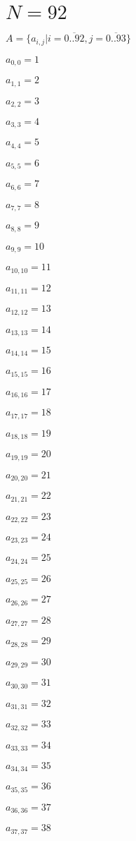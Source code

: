 \documentclass[a4paper,12pt]{article}
\begin{document}
\section{ $N = 92$ }
$A = \{ a _{ i, j } | i = \overline { 0..92 }, j = \overline { 0..93 } \}$

$a _{ 0, 0 } = 1$

$a _{ 1, 1 } = 2$

$a _{ 2, 2 } = 3$

$a _{ 3, 3 } = 4$

$a _{ 4, 4 } = 5$

$a _{ 5, 5 } = 6$

$a _{ 6, 6 } = 7$

$a _{ 7, 7 } = 8$

$a _{ 8, 8 } = 9$

$a _{ 9, 9 } = 10$

$a _{ 10, 10 } = 11$

$a _{ 11, 11 } = 12$

$a _{ 12, 12 } = 13$

$a _{ 13, 13 } = 14$

$a _{ 14, 14 } = 15$

$a _{ 15, 15 } = 16$

$a _{ 16, 16 } = 17$

$a _{ 17, 17 } = 18$

$a _{ 18, 18 } = 19$

$a _{ 19, 19 } = 20$

$a _{ 20, 20 } = 21$

$a _{ 21, 21 } = 22$

$a _{ 22, 22 } = 23$

$a _{ 23, 23 } = 24$

$a _{ 24, 24 } = 25$

$a _{ 25, 25 } = 26$

$a _{ 26, 26 } = 27$

$a _{ 27, 27 } = 28$

$a _{ 28, 28 } = 29$

$a _{ 29, 29 } = 30$

$a _{ 30, 30 } = 31$

$a _{ 31, 31 } = 32$

$a _{ 32, 32 } = 33$

$a _{ 33, 33 } = 34$

$a _{ 34, 34 } = 35$

$a _{ 35, 35 } = 36$

$a _{ 36, 36 } = 37$

$a _{ 37, 37 } = 38$
\end{document}

